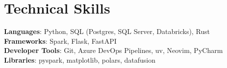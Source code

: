 %
\section{Technical Skills}
 \begin{itemize}[leftmargin=0.15in, label={}]
    \small{\item{
     \textbf{Languages}{: Python, SQL (Postgres, SQL Server, Databricks), Rust} \\
     \textbf{Frameworks}{: Spark, Flask, FastAPI} \\
     \textbf{Developer Tools}{: Git, Azure DevOps Pipelines, uv, Neovim, PyCharm} \\
     \textbf{Libraries}{: pyspark, matplotlib, polars, datafusion}
    }}
 \end{itemize}


